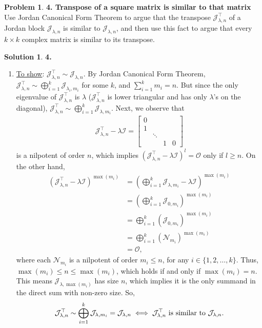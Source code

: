 \documentclass{book}
\theoremstyle{definition}
\newtheorem*{prob*}{Problem}
\newtheorem*{sln*}{Solution}
\newcommand{\N}{\mathcal{N}}
\newcommand{\jor}{\mathcal{J}}
\begin{document}
\begin{prob*}\textbf{4. Transpose of a square matrix is similar to that matrix} \\
	Use Jordan Canonical Form Theorem to argue that the transpose $\mathcal{J}^\top_{\lambda,n}$ of a Jordan block $\jor_{\lambda,n}$ is similar to $\jor_{\lambda,n}$, and then use this fact to argue that every $k\times k$ complex matrix is similar to its transpose.\\
	
	\begin{sln*}\textbf{4. }
		
		\begin{enumerate}
			\item \underline{To show}: $ \jor^\top_{\lambda,n} \sim  \jor_{\lambda, n} $. By Jordan Canonical Form Theorem, $\mathcal{J}^\top_{\lambda,n} \sim \bigoplus^k_{i=1} \jor_{\lambda_i, m_i}$ for some $k$, and $\sum^k_{i=1}m_i = n$. But since the only eigenvalue of $\jor^\top_{\lambda,n}$ is $\lambda$ ($\jor^\top_{\lambda,n}$ is lower triangular and has only $\lambda$'s on the diagonal), $\jor^\top_{\lambda,n} \sim \bigoplus^k_{i=1}\jor_{\lambda,m_i}$. Next, we observe that 
		\begin{align*}
		\jor^\top_{\lambda,n} - \lambda \mathcal{I} = \begin{bmatrix}
		0 && &  \\
		1 &  && \\
		&\ddots & \\
		&   &1& 0  
		\end{bmatrix}
		\end{align*} 
		is a nilpotent of order $n$, which implies $(\jor^\top_{\lambda,n} - \lambda \mathcal{I})^l = \mathcal{O}$ only if $l \geq n$. On the other hand,
		\begin{align*}
		(\jor^\top_{\lambda,n} - \lambda \mathcal{I})^{\max(m_i)}
		&=\left(\bigoplus^k_{i=1}\jor_{\lambda,m_i} - \lambda\mathcal{I}\right)^{\max(m_i)}\\ 
		&= \left(\bigoplus^k_{i=1}\jor_{0,m_i}\right)^{\max(m_i)}\\
		&=\bigoplus^k_{i=1} \left(\jor_{0,m_i}\right)^{\max(m_i)}\\
		&= \bigoplus^k_{i=1}\left(\N_{m_i}\right)^{\max(m_i)} \\
		&= \mathcal{O},
		\end{align*}
		where each $\N_{m_i}$ is a nilpotent of order $m_i \leq n$, for any $i \in \{1,2,\dots,k\}$. Thus, $\max(m_i) \leq n \leq \max(m_i)$, which holds if and only if $\max(m_i) = n$. This means $\jor_{\lambda, \max(m_i)}$ has size $n$, which implies it is the only summand in the direct sum with non-zero size. So, 
		\begin{align*}
		\jor^\top_{\lambda,n} \sim \bigoplus^k_{i=1} \jor_{\lambda, m_i} = \jor_{\lambda, n}\iff \text{$\jor^\top_{\lambda,n}$ is similar to $ \jor_{\lambda, n}$.}
		\end{align*}
		

\end{enumerate}
\end{sln*}
\end{prob*}
\end{document}
